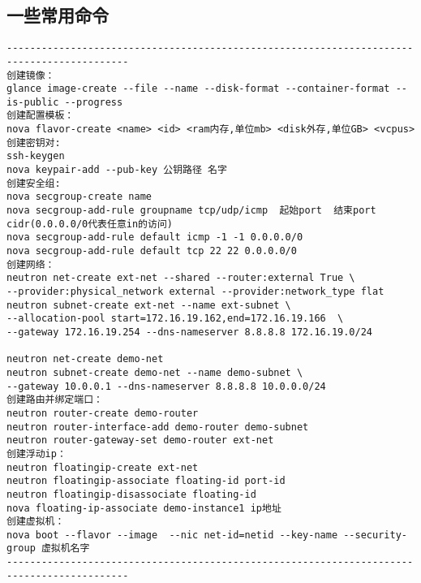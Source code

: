 \documentclass[a4paper,left=1.5cm,right=1.5cm,11pt]{article}
\begin{document}
\subsection{一些常用命令}
\begin{lstlisting}
-------------------------------------------------------------------------------------------
创建镜像：
glance image-create --file --name --disk-format --container-format --is-public --progress
创建配置模板：
nova flavor-create <name> <id> <ram内存,单位mb> <disk外存,单位GB> <vcpus>
创建密钥对:
ssh-keygen
nova keypair-add --pub-key 公钥路径 名字
创建安全组:
nova secgroup-create name
nova secgroup-add-rule groupname tcp/udp/icmp  起始port  结束port  cidr(0.0.0.0/0代表任意in的访问) 
nova secgroup-add-rule default icmp -1 -1 0.0.0.0/0
nova secgroup-add-rule default tcp 22 22 0.0.0.0/0
创建网络：
neutron net-create ext-net --shared --router:external True \
--provider:physical_network external --provider:network_type flat
neutron subnet-create ext-net --name ext-subnet \
--allocation-pool start=172.16.19.162,end=172.16.19.166  \
--gateway 172.16.19.254 --dns-nameserver 8.8.8.8 172.16.19.0/24

neutron net-create demo-net
neutron subnet-create demo-net --name demo-subnet \
--gateway 10.0.0.1 --dns-nameserver 8.8.8.8 10.0.0.0/24
创建路由并绑定端口：
neutron router-create demo-router
neutron router-interface-add demo-router demo-subnet
neutron router-gateway-set demo-router ext-net
创建浮动ip：
neutron floatingip-create ext-net
neutron floatingip-associate floating-id port-id
neutron floatingip-disassociate floating-id
nova floating-ip-associate demo-instance1 ip地址
创建虚拟机：
nova boot --flavor --image  --nic net-id=netid --key-name --security-group 虚拟机名字
-------------------------------------------------------------------------------------------
\end{lstlisting}
\end{document}
